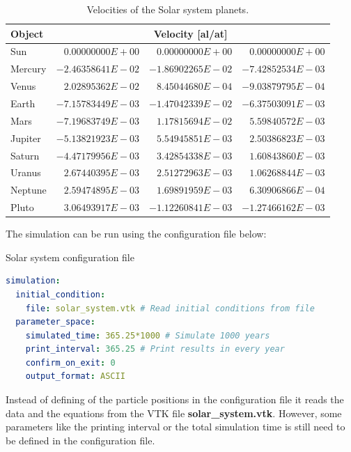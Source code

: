 \documentclass[a4paper,12pt,openany]{book}
\theoremstyle{break}
\begin{document}
\begin{table} [H]
\begin{center}
\caption{Velocities of the Solar system planets.}\label{tbl:solarsystemvel}
\begin{tabular}{ l r r r }
\toprule[1.5pt]
\bf Object & \multicolumn{3}{c}{\bf Velocity [al/at]} \\
\midrule
Sun & $0.00000000E+00$  &  $0.00000000E+00$  &  $0.00000000E+00$ \\
Mercury & $-2.46358641E-02$  &  $-1.86902265E-02$  &  $-7.42852534E-03$ \\
Venus & $2.02895362E-02$  &  $8.45044680E-04$  &  $-9.03879795E-04$ \\
Earth & $-7.15783449E-03$  &  $-1.47042339E-02$  &  $-6.37503091E-03$ \\
Mars & $-7.19683749E-03$  &  $1.17815694E-02$  &  $5.59840572E-03$ \\
Jupiter & $-5.13821923E-03$  &  $5.54945851E-03$  &  $2.50386823E-03$ \\
Saturn & $-4.47179956E-03$  &  $3.42854338E-03$  &  $1.60843860E-03$ \\
Uranus & $2.67440395E-03$  &  $2.51272963E-03$  &  $1.06268844E-03$ \\
Neptune & $2.59474895E-03$  &  $1.69891959E-03$  &  $6.30906866E-04$ \\
Pluto & $3.06493917E-03$  &  $-1.12260841E-03$  &  $-1.27466162E-03$ \\
\bottomrule[1.25pt]
\end{tabular}
\end{center}
\end{table}
The simulation can be run using the configuration file below:
\begin{samepage}
\begin{example}{Solar system configuration file}{}
\lstset{basicstyle=\tiny}
\begin{lstlisting}[language=YAML]
simulation:
  initial_condition:
    file: solar_system.vtk # Read initial conditions from file
  parameter_space:
    simulated_time: 365.25*1000 # Simulate 1000 years
    print_interval: 365.25 # Print results in every year
    confirm_on_exit: 0
    output_format: ASCII
\end{lstlisting}
\end{example}
\end{samepage}
Instead of defining of the particle positions in the configuration file it reads the data and the equations from the VTK file \textbf{solar\_system.vtk}. However, some parameters like the printing interval or the total simulation time is still need to be defined in the configuration file.
\end{document}

